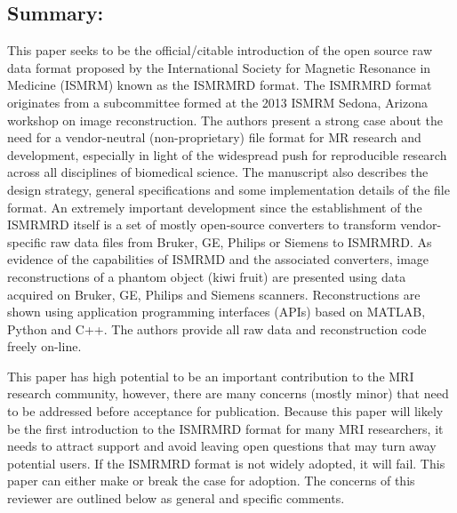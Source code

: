 \documentclass[12pt, draft]{article}
\begin{document}
{\subsection*{Summary:}
This paper seeks to be the official/citable introduction of the open source raw data format proposed by the International Society for Magnetic Resonance in Medicine (ISMRM) known as the ISMRMRD format. The ISMRMRD format originates from a subcommittee formed at the 2013 ISMRM Sedona, Arizona workshop on image reconstruction. The authors present a strong case about the need for a vendor-neutral (non-proprietary) file format for MR research and development, especially in light of the widespread push for reproducible research across all disciplines of biomedical science. The manuscript also describes the design strategy, general specifications and some implementation details of the file format. An extremely important development since the establishment of the ISMRMRD itself is a set of mostly open-source converters to transform vendor-specific raw data files from Bruker, GE, Philips or Siemens to ISMRMRD. As evidence of the capabilities of ISMRMD and the associated converters, image reconstructions of a phantom object (kiwi fruit) are presented using data acquired on Bruker, GE, Philips and Siemens scanners. Reconstructions are shown using application programming interfaces (APIs) based on MATLAB, Python and C++. The authors provide all raw data and reconstruction code freely on-line.

This paper has high potential to be an important contribution to the MRI research community, however, there are many concerns (mostly minor) that need to be addressed before acceptance for publication. Because this paper will likely be the first introduction to the ISMRMRD format for many MRI researchers, it needs to attract support and avoid leaving open questions that may turn away potential users. If the ISMRMRD format is not widely adopted, it will fail. This paper can either make or break the case for adoption. The concerns of this reviewer are outlined below as general and specific comments.

}
\end{document}
